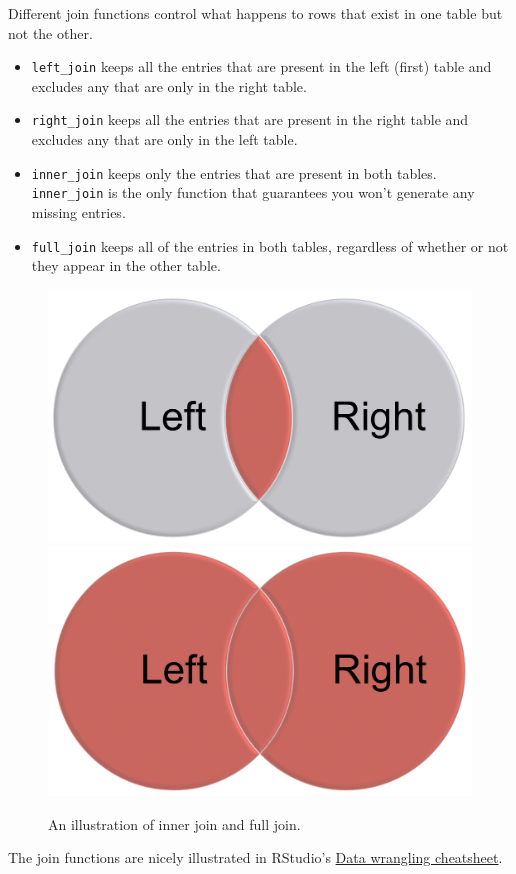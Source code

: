\documentclass[]{book}
\providecommand{\tightlist}{%
  \setlength{\itemsep}{0pt}\setlength{\parskip}{0pt}}
\begin{document}
Different join functions control what happens to rows that exist in one
table but not the other.

\begin{itemize}
\tightlist
\item
  \texttt{left\_join} keeps all the entries that are present in the left
  (first) table and excludes any that are only in the right table.
\item
  \texttt{right\_join} keeps all the entries that are present in the
  right table and excludes any that are only in the left table.
\item
  \texttt{inner\_join} keeps only the entries that are present in both
  tables. \texttt{inner\_join} is the only function that guarantees you
  won't generate any missing entries.
\item
  \texttt{full\_join} keeps all of the entries in both tables,
  regardless of whether or not they appear in the other table.
\end{itemize}

\begin{figure}

{\centering \includegraphics[width=0.3\linewidth]{figures/Inner} \includegraphics[width=0.3\linewidth]{figures/Full} 

}

\caption{An illustration of inner join and full join.}\label{fig:ifjoin}
\end{figure}

The join functions are nicely illustrated in RStudio's
\href{https://www.rstudio.com/wp-content/uploads/2015/02/data-wrangling-cheatsheet.pdf}{Data
wrangling cheatsheet}.
\end{document}
